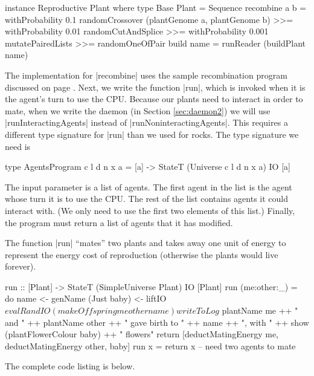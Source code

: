 \begin{code}
instance Reproductive Plant where
  type Base Plant = Sequence
  recombine a b = 
    withProbability 0.1 randomCrossover (plantGenome a, plantGenome b) >>=
    withProbability 0.01 randomCutAndSplice >>=
    withProbability 0.001 mutatePairedLists >>=
    randomOneOfPair
  build name = runReader (buildPlant name)
\end{code} 

The implementation for |recombine| uses the sample recombination
program discussed on page \pageref{code:recombination}.
Next, we write the function |run|, 
which is invoked when it is the agent's turn to use the CPU.
Because our plants need to interact in order to mate,
when we write the daemon (in Section \ref{sec:daemon2}) we will use
|runInteractingAgents| instead of |runNoninteractingAgents|.
This requires a different type signature for |run| than we used for
rocks.
The type signature we need is

\begin{code}
type AgentsProgram c l d n x a = 
  [a] -> StateT (Universe c l d n x a) IO [a]
\end{code} 

The input parameter is a list of agents. 
The first agent in the list is the agent whose turn it is to use the 
CPU.
The rest of the list contains agents it could interact with.
(We only need to use the first two elements of this list.)
Finally, the program must return a list of agents that it has modified.

The function |run| ``mates'' two plants and takes away one unit of energy 
to represent the energy cost of reproduction
(otherwise the plants would live forever).

\begin{code}
run :: [Plant] -> StateT (SimpleUniverse Plant) IO [Plant]
run (me:other:_) = do
  name <- genName
  (Just baby) <- liftIO $ evalRandIO (makeOffspring me other name)
  writeToLog $ 
    plantName me ++ " and " ++ plantName other ++
      " gave birth to " ++ name ++ ", with " ++ 
       show (plantFlowerColour baby) ++ " flowers"
  return [deductMatingEnergy me, deductMatingEnergy other, baby]
run x = return x -- need two agents to mate
\end{code}

The complete code listing is below.
\label{code:plant}

